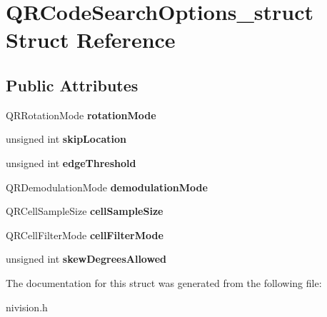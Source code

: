 \hypertarget{structQRCodeSearchOptions__struct}{
\section{QRCodeSearchOptions\_\-struct Struct Reference}
\label{structQRCodeSearchOptions__struct}
}
\subsection*{Public Attributes}
\begin{DoxyCompactItemize}
\item 
\hypertarget{structQRCodeSearchOptions__struct_afcc00e9b2afac82b46844b8ec95bd5ef}{
QRRotationMode {\bfseries rotationMode}}
\label{structQRCodeSearchOptions__struct_afcc00e9b2afac82b46844b8ec95bd5ef}

\item 
\hypertarget{structQRCodeSearchOptions__struct_acc663bf2d340c04ebc9b8467a7ea4228}{
unsigned int {\bfseries skipLocation}}
\label{structQRCodeSearchOptions__struct_acc663bf2d340c04ebc9b8467a7ea4228}

\item 
\hypertarget{structQRCodeSearchOptions__struct_ae3ac9367cdd9c6941114e87164538e7f}{
unsigned int {\bfseries edgeThreshold}}
\label{structQRCodeSearchOptions__struct_ae3ac9367cdd9c6941114e87164538e7f}

\item 
\hypertarget{structQRCodeSearchOptions__struct_a0b15cde5efa49d38b234d147425977b9}{
QRDemodulationMode {\bfseries demodulationMode}}
\label{structQRCodeSearchOptions__struct_a0b15cde5efa49d38b234d147425977b9}

\item 
\hypertarget{structQRCodeSearchOptions__struct_ae85dbc04d29272821566a88e0047e9b0}{
QRCellSampleSize {\bfseries cellSampleSize}}
\label{structQRCodeSearchOptions__struct_ae85dbc04d29272821566a88e0047e9b0}

\item 
\hypertarget{structQRCodeSearchOptions__struct_ac5c77133205cec63c94cf6fcd0609172}{
QRCellFilterMode {\bfseries cellFilterMode}}
\label{structQRCodeSearchOptions__struct_ac5c77133205cec63c94cf6fcd0609172}

\item 
\hypertarget{structQRCodeSearchOptions__struct_a4db583002ed78c0dd3cccab61db4b0f7}{
unsigned int {\bfseries skewDegreesAllowed}}
\label{structQRCodeSearchOptions__struct_a4db583002ed78c0dd3cccab61db4b0f7}

\end{DoxyCompactItemize}


The documentation for this struct was generated from the following file:\begin{DoxyCompactItemize}
\item 
nivision.h\end{DoxyCompactItemize}
